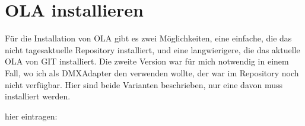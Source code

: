 \documentclass[letterpaper,10pt,ngerman]{sphinxmanual}
\begin{document}
\begin{sphinxVerbatim}[commandchars=\\\{\}]
 
  

  

  

  

  
\end{sphinxVerbatim}


\section{OLA installieren}
\label{\detokenize{raspberry:ola-installieren}}
Für die Installation von OLA gibt es zwei Möglichkeiten, eine einfache, die das
nicht tagesaktuelle Repository installiert, und eine langwierigere, die das
aktuelle OLA von GIT installiert. Die zweite Version war für mich notwendig in
einem Fall, wo ich als DMX\sphinxhyphen{}Adapter den  verwenden
wollte, der war im Repository noch nicht verfügbar. Hier sind beide
Varianten beschrieben, nur eine davon muss installiert werden.



hier eintragen:

\begin{sphinxVerbatim}[commandchars=\\\{\}]
   
\end{sphinxVerbatim}
\end{document}
